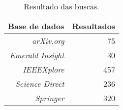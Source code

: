 \begin{table}[!htb]
    \centering
    \caption[Resultado das buscas por artigos nas bases selecionadas]{Resultado das buscas.
    \label{tab:resultadosBuscas1}}
    \begin{tabular}{rr}
        \toprule
           \textbf{Base de dados} & \textbf{Resultados} \\ \hline
        \midrule
            \textit{arXiv.org}              & 75                   \\
		\textit{Emerald Insight}        & 30                   \\
		\textit{IEEEXplore}             & 457                   \\
		\textit{Science Direct}         & 236                   \\
		\textit{Springer}               & 320                   \\ \hline
        \bottomrule
    \end{tabular}
\end{table}
